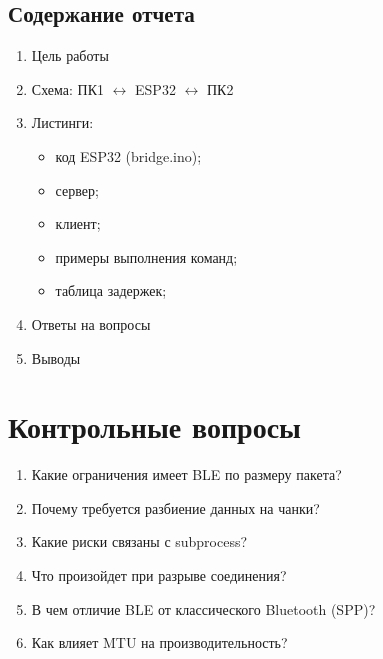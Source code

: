 \subsection{Содержание отчета}
\begin{enumerate}
    \item Цель работы
    \item Схема: ПК1 $\leftrightarrow$ ESP32 $\leftrightarrow$ ПК2
    \item Листинги:
    \begin{itemize}
        \item код ESP32 (bridge.ino);
        \item сервер;
        \item клиент;
        \item примеры выполнения команд;
        \item таблица задержек;
    \end{itemize}
    \item Ответы на вопросы
    \item Выводы
\end{enumerate}

\section*{Контрольные вопросы}
\begin{enumerate}
    \item Какие ограничения имеет BLE по размеру пакета?
    \item Почему требуется разбиение данных на чанки?
    \item Какие риски связаны с subprocess?
    \item Что произойдет при разрыве соединения?
    \item В чем отличие BLE от классического Bluetooth (SPP)?
    \item Как влияет MTU на производительность?
\end{enumerate}
